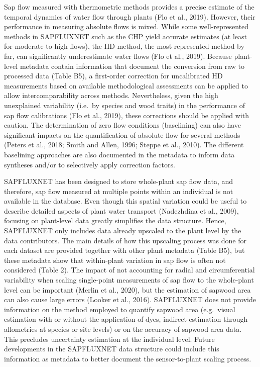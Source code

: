 \documentclass[11pt,twoside]{reedthesis}
\begin{document}
Sap flow measured with thermometric methods provides a precise estimate
of the temporal dynamics of water flow through plants (Flo et al.,
2019). However, their performance in measuring absolute flows is mixed.
While some well-represented methods in SAPFLUXNET such as the CHP yield
accurate estimates (at least for moderate-to-high flows), the HD method,
the most represented method by far, can significantly underestimate
water flows (Flo et al., 2019). Because plant-level metadata contain
information that document the conversion from raw to processed data
(Table B5), a first-order correction for uncalibrated HD measurements
based on available methodological assessments can be applied to allow
intercomparability across methods. Nevertheless, given the high
unexplained variability (i.e.~by species and wood traits) in the
performance of sap flow calibrations (Flo et al., 2019), these
corrections should be applied with caution. The determination of zero
flow conditions (baselining) can also have significant impacts on the
quantification of absolute flow for several methods (Peters et al.,
2018; Smith and Allen, 1996; Steppe et al., 2010). The different
baselining approaches are also documented in the metadata to inform data
syntheses and/or to selectively apply correction factors.\par

SAPFLUXNET has been designed to store whole-plant sap flow data, and
therefore, sap flow measured at multiple points within an individual is
not available in the database. Even though this spatial variation could
be useful to describe detailed aspects of plant water transport
(Nadezhdina et al., 2009), focusing on plant-level data greatly
simplifies the data structure. Hence, SAPFLUXNET only includes data
already upscaled to the plant level by the data contributors. The main
details of how this upscaling process was done for each dataset are
provided together with other plant metadata (Table B5), but these
metadata show that within-plant variation in sap flow is often not
considered (Table 2). The impact of not accounting for radial and
circumferential variability when scaling single-point measurements of
sap flow to the whole-plant level can be important (Merlin et al.,
2020), but the estimation of sapwood area can also cause large errors
(Looker et al., 2016). SAPFLUXNET does not provide information on the
method employed to quantify sapwood area (e.g.~visual estimation with or
without the application of dyes, indirect estimation through allometries
at species or site levels) or on the accuracy of sapwood area data. This
precludes uncertainty estimation at the individual level. Future
developments in the SAPFLUXNET data structure could include this
information as metadata to better document the sensor-to-plant scaling
process.\par
\end{document}
